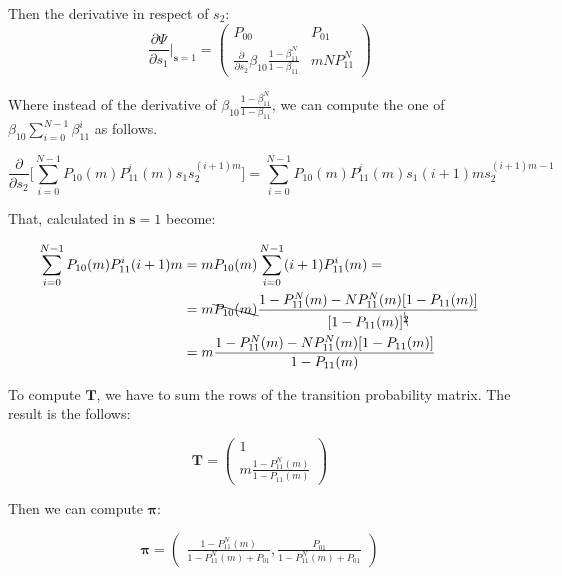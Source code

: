 Then the derivative in respect of $s_2$:
\begin{equation*}
	\frac{\partial\Psi}{\partial s_1}\bigg|_{\mathbf{s} = 1} =
	\begin{pmatrix}
		P_{00} & P_{01}\\
		\frac{\partial}{\partial s_2}\beta_{10}\frac{1-\beta_{11}^N}{1-\beta_{11}} & mNP_{11}^N
	\end{pmatrix}
\end{equation*}

Where instead of the derivative of $\beta_{10}\frac{1-\beta_{11}^N}{1-\beta_{11}}$, we can compute the one of $\beta_{10}\sum_{i=0}^{N-1}\beta_{11}^i$ as follows.

\begin{equation*}
	\frac{\partial}{\partial s_2}\bigg[\sum_{i=0}^{N-1}P_{10}(m)P_{11}^i(m)s_1s_2^{(i+1)m}\bigg] = \sum_{i=0}^{N-1}P_{10}(m)P_{11}^i(m)s_1(i+1)ms_2^{(i+1)m-1}
\end{equation*}

That, calculated in $\mathbf{s} = 1$ become:

\begin{equation*}
	\begin{split}
		\sum_{i=0}^{N-1}P_{10}(m)P_{11}^i(i+1)m &= mP_{10}(m)\sum_{i=0}^{N-1}(i+1)P_{11}^i(m) = \\
		&=m\bcancel{P_{10}(m)}\frac{1-P_{11}^N(m)-NP_{11}^N(m)[1-P_{11}(m)]}{[1-P_{11}(m)]^{\bcancel{2}}}\\
		&=m\frac{1-P_{11}^N(m)-NP_{11}^N(m)[1-P_{11}(m)]}{1-P_{11}(m)}
	\end{split}
\end{equation*}

To compute $\mathbf{T}$, we have to sum the rows of the transition probability matrix. The result is the follows:

\begin{equation}
\mathbf{T} =
	\begin{pmatrix}
		1 \\
		m\frac{1-P_{11}^N(m)}{1-P_{11}(m)}
	\end{pmatrix}
\end{equation}

Then we can compute $\mathbf{\pi}$:

\begin{equation}
\mathbf{\pi} =
	\begin{pmatrix}
		\frac{1-P_{11}^N(m)}{1-P_{11}^N(m) + P_{01}} ,
		\frac{P_{01}}{1-P_{11}^N(m) + P_{01}}
	\end{pmatrix}
\end{equation}

